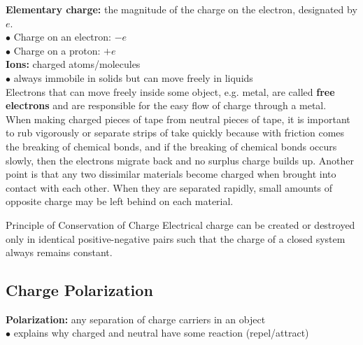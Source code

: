         \textbf{Elementary charge:} the magnitude of the charge on the electron, designated by $e$. \\
        $\bullet$ Charge on an electron: $-e$ \\
        $\bullet$ Charge on a proton: $+e$ \\

        \textbf{Ions:} charged atoms/molecules \\
        $\bullet$ always immobile in solids but can move freely in liquids \\

        Electrons that can move freely inside some object, e.g. metal, are called \textbf{free electrons} and are responsible for the easy flow of charge through a metal. \\

        When making charged pieces of tape from neutral pieces of tape, it is important to rub vigorously or separate strips of take quickly because with friction comes the breaking of chemical bonds, and if the breaking
        of chemical bonds occurs slowly, then the electrons migrate back and no surplus charge builds up. Another point is that any two dissimilar materials become charged when brought into contact with each other. When
        they are separated rapidly, small amounts of opposite charge may be left behind on each material. \\

        \begin{theorem}{Principle of Conservation of Charge}
            Electrical charge can be created or destroyed only in identical positive-negative pairs such that the charge of a closed system always remains constant.
        \end{theorem}

        \textit{}

    \subsection{Charge Polarization}        %

        \textbf{Polarization:} any separation of charge carriers in an object \\
        $\bullet$ explains why charged and neutral have some reaction (repel/attract) \\

